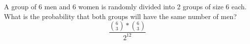 \item A group of 6 men and 6 women is randomly divided into 2 groups of size 6 each. What is the probability that both groups will have the same number of men?
\[ \frac{\binom{6}{3} * \binom{6}{3}}{2^{12}} \]